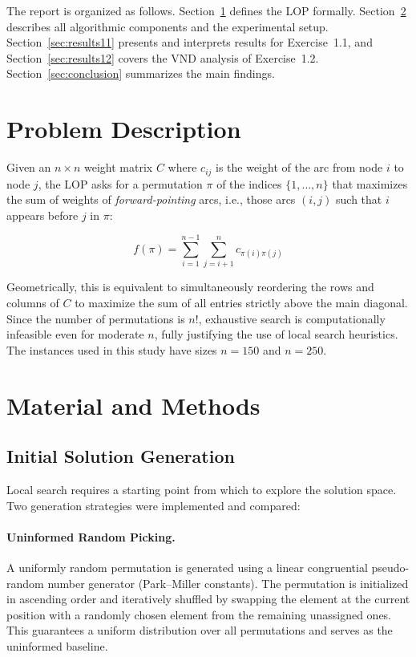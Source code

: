 \documentclass[11pt, a4paper]{article}
\begin{document}
The report is organized as follows. Section~\ref{sec:problem} defines the LOP formally. Section~\ref{sec:methods} describes all algorithmic components and the experimental setup. Section~\ref{sec:results11} presents and interprets results for Exercise~1.1, and Section~\ref{sec:results12} covers the VND analysis of Exercise~1.2. Section~\ref{sec:conclusion} summarizes the main findings.

\section{Problem Description}
\label{sec:problem}

Given an $n \times n$ weight matrix $C$ where $c_{ij}$ is the weight of the arc from node $i$ to node $j$, the LOP asks for a permutation $\pi$ of the indices $\{1, \dots, n\}$ that maximizes the sum of weights of \emph{forward-pointing} arcs, i.e., those arcs $(i, j)$ such that $i$ appears before $j$ in $\pi$:

\begin{equation}
    f(\pi) = \sum_{i=1}^{n-1} \sum_{j=i+1}^{n} c_{\pi(i)\pi(j)}
\end{equation}

Geometrically, this is equivalent to simultaneously reordering the rows and columns of $C$ to maximize the sum of all entries strictly above the main diagonal. Since the number of permutations is $n!$, exhaustive search is computationally infeasible even for moderate $n$, fully justifying the use of local search heuristics. The instances used in this study have sizes $n = 150$ and $n = 250$.

\section{Material and Methods}
\label{sec:methods}

\subsection{Initial Solution Generation}

Local search requires a starting point from which to explore the solution space. Two generation strategies were implemented and compared:

\paragraph{Uninformed Random Picking.} A uniformly random permutation is generated using a linear congruential pseudo-random number generator (Park--Miller constants). The permutation is initialized in ascending order and iteratively shuffled by swapping the element at the current position with a randomly chosen element from the remaining unassigned ones. This guarantees a uniform distribution over all permutations and serves as the uninformed baseline.
\end{document}

